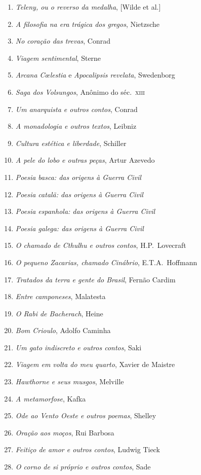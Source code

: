\begin{enumerate}
\item \textit{Teleny, ou o reverso da medalha}, [Wilde et al.]
\item \textit{A filosofia na era trágica dos gregos}, Nietzsche
\item \textit{No coração das trevas}, Conrad
\item \textit{Viagem sentimental}, Sterne
\item \textit{Arcana C\oe lestia} e \textit{Apocalipsis revelata}, Swedenborg
\item \textit{Saga dos Volsungos}, Anônimo do séc.~\textsc{xiii}
\item \textit{Um anarquista e outros contos}, Conrad
\item \textit{A monadologia e outros textos}, Leibniz
\item \textit{Cultura estética e liberdade}, Schiller
\item \textit{A pele do lobo e outras peças}, Artur Azevedo
\item \textit{Poesia basca: das origens à Guerra Civil} 
\item \textit{Poesia catalã: das origens à Guerra Civil} 
\item \textit{Poesia espanhola: das origens à Guerra Civil} 
\item \textit{Poesia galega: das origens à Guerra Civil} 
\item \textit{O chamado de Cthulhu e outros contos}, H.P.~Lovecraft 
\item \textit{O pequeno Zacarias, chamado Cinábrio}, E.T.A.~Hoffmann
\item \textit{Tratados da terra e gente do Brasil}, Fernão Cardim 
\item \textit{Entre camponeses}, Malatesta
\item \textit{O Rabi de Bacherach}, Heine
\item \textit{Bom Crioulo}, Adolfo Caminha
\item \textit{Um gato indiscreto e outros contos}, Saki
\item \textit{Viagem em volta do meu quarto}, Xavier de Maistre 
\item \textit{Hawthorne e seus musgos}, Melville
\item \textit{A metamorfose}, Kafka
\item \textit{Ode ao Vento Oeste e outros poemas}, Shelley
\item \textit{Oração aos moços}, Rui Barbosa
\item \textit{Feitiço de amor e outros contos}, Ludwig Tieck
\item \textit{O corno de si próprio e outros contos}, Sade

\end{enumerate}

